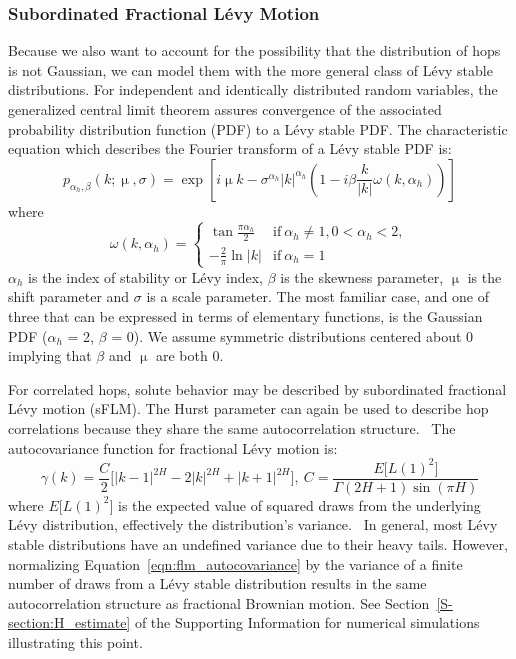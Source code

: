 \documentclass[journal=jctcce,manuscript=article]{achemso}
\begin{document}
  \subsubsection{Subordinated Fractional L\'evy Motion}\label{method:sflm}

  Because we also want to account for the possibility that the distribution of
  hops is not Gaussian, we can model them with the more general class of L\'evy
  stable distributions. For independent and identically distributed random
  variables, the generalized central limit theorem assures convergence of the
  associated probability distribution function (PDF) to a L\'evy stable PDF.
  \cite{klages_anomalous_2008} The characteristic equation which describes the
  Fourier transform of a L\'evy stable PDF is: 
  \begin{equation}
    p_{\alpha_h, \beta}(k;\upmu,\sigma) =\exp\left[i\upmu k - \sigma^{\alpha_h}|k|^{\alpha_h}\left(1 - i\beta\frac{k}{|k|}\omega(k, \alpha_h)\right)\right]
  \end{equation}
  where \\
  \[\omega(k, \alpha_h) = \begin{cases}
  	\tan{\frac{\pi \alpha_h}{2}} & \text{if}~\alpha_h \neq 1, 0 < \alpha_h < 2, \\
  	-\frac{2}{\pi}\ln |k| & \text{if}~\alpha_h = 1
  	 \end{cases}
  \]
  $\alpha_h$ is the index of stability or L\'evy index, $\beta$ is the skewness 
  parameter, $\upmu$ is the shift parameter and $\sigma$ is a scale parameter. The most
  familiar case, and one of three that can be expressed in terms of elementary functions,
  is the Gaussian PDF ($\alpha_h$ = 2, $\beta$ = 0). We assume symmetric distributions
  centered about 0 implying that $\beta$ and $\upmu$ are both 0.
  
  For correlated hops, solute behavior may be described by subordinated
  fractional L\'evy motion (sFLM). The Hurst parameter can again be used to
  describe hop correlations because they share the same autocorrelation
  structure.~\cite{tikanmaki_fractional_2010} The autocovariance function for
  fractional L\'evy motion is:
  \begin{equation}
    \gamma(k) = \dfrac{C}{2}\bigg[|k-1|^{2H} - 2|k|^{2H} + |k+1|^{2H}\bigg],
    ~C = \frac{E\big[L(1)^2\big]}{\Gamma(2H + 1)\sin(\pi H)}
    \label{eqn:flm_autocovariance}
  \end{equation}
  where $E\big[L(1)^2\big]$ is the expected value of squared draws from the 
  underlying L\'evy distribution, effectively the distribution's 
  variance.~\cite{bishwal_maximum_2011} In general, most L\'evy stable distributions
  have an undefined variance due to their heavy tails. However, normalizing
  Equation~\ref{eqn:flm_autocovariance} by the variance of a finite number of draws
  from a L\'evy stable distribution results in the same autocorrelation structure as 
  fractional Brownian motion. See Section~\ref{S-section:H_estimate} of the Supporting
  Information for numerical simulations illustrating this point.
  
\end{document}
